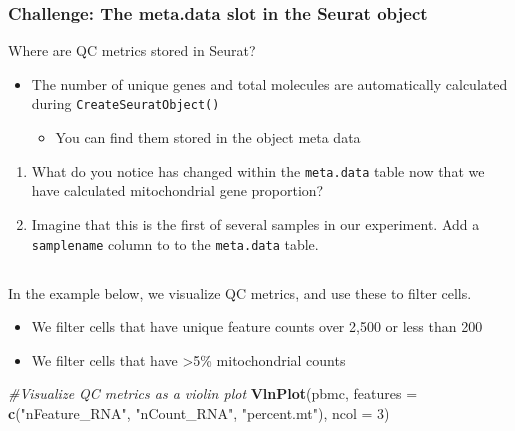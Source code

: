 \documentclass[
]{book}
\newenvironment{Shaded}{\begin{snugshade}}{\end{snugshade}}
\newcommand{\AttributeTok}[1]{\textcolor[rgb]{0.13,0.29,0.53}{#1}}
\newcommand{\CommentTok}[1]{\textcolor[rgb]{0.56,0.35,0.01}{\textit{#1}}}
\newcommand{\DecValTok}[1]{\textcolor[rgb]{0.00,0.00,0.81}{#1}}
\newcommand{\FunctionTok}[1]{\textcolor[rgb]{0.13,0.29,0.53}{\textbf{#1}}}
\newcommand{\NormalTok}[1]{#1}
\newcommand{\StringTok}[1]{\textcolor[rgb]{0.31,0.60,0.02}{#1}}
\providecommand{\tightlist}{%
  \setlength{\itemsep}{0pt}\setlength{\parskip}{0pt}}
\begin{document}
\hypertarget{challenge-the-meta.data-slot-in-the-seurat-object}{%
\subsubsection*{Challenge: The meta.data slot in the Seurat object}\label{challenge-the-meta.data-slot-in-the-seurat-object}}

Where are QC metrics stored in Seurat?

\begin{itemize}
\tightlist
\item
  The number of unique genes and total molecules are automatically calculated during \texttt{CreateSeuratObject()}

  \begin{itemize}
  \tightlist
  \item
    You can find them stored in the object meta data
  \end{itemize}
\end{itemize}

\begin{enumerate}
\def\labelenumi{\arabic{enumi}.}
\item
  What do you notice has changed within the \texttt{meta.data} table now that we have calculated mitochondrial gene proportion?
\item
  Imagine that this is the first of
  several samples in our experiment. Add a \texttt{samplename} column to to the \texttt{meta.data} table.
\end{enumerate}

\hypertarget{section-1}{%
\subsection*{}\label{section-1}}

In the example below, we visualize QC metrics, and use these to filter cells.

\begin{itemize}
\tightlist
\item
  We filter cells that have unique feature counts over 2,500 or less than 200
\item
  We filter cells that have \textgreater5\% mitochondrial counts
\end{itemize}

\begin{Shaded}
\begin{Highlighting}[]
\CommentTok{\#Visualize QC metrics as a violin plot}
\FunctionTok{VlnPlot}\NormalTok{(pbmc, }\AttributeTok{features =} \FunctionTok{c}\NormalTok{(}\StringTok{"nFeature\_RNA"}\NormalTok{, }\StringTok{"nCount\_RNA"}\NormalTok{, }\StringTok{"percent.mt"}\NormalTok{), }\AttributeTok{ncol =} \DecValTok{3}\NormalTok{)}
\end{Highlighting}
\end{Shaded}
\end{document}
